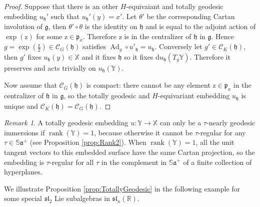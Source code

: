 \documentclass[reqno,10pt]{amsart}
\theoremstyle{plain}
\theoremstyle{definition}
\theoremstyle{remark}
\newtheorem{rem}[thm]{Remark}
\newcommand{\type}{\tau}
\newcommand{\R}{\mathbb{R}}
\newcommand{\Sph}{\mathbb{S}}
\DeclareMathOperator{\Ad}{Ad}
\DeclareMathOperator{\rank}{rank}
\newcommand{\X}{\mathbb{X}}
\begin{document}
\begin{proof}
\medskip
Suppose that there is an other $H$-equivaiant and totally geodesic embedding $u_\mathfrak{h}'$ such that $u_\mathfrak{h}'(y)=x'$. Let $\theta'$ be the corresponding Cartan involution of $\mathfrak{g}$, then $\theta' \circ \theta$ is the identity on $\mathfrak{h}$ and is equal to the adjoint action of $\exp(\mathrm{z})$ for some $\mathrm{z}\in \mathfrak{p}_{x}$. Therefore $\mathrm{z}$ is in the centralizer of $\mathfrak{h}$ in $\mathfrak{g}$. 
Hence $g=\exp(\frac{\mathrm{z}}{2})\in 
\mathcal{C}_G(\mathfrak{h})$ satisfies $\Ad_g\circ u'_\mathfrak{h}=u_\mathfrak{h}$.
Conversely let $g'\in \mathcal{C}_K\left(\mathfrak{h}\right)$, then $g'$ fixes $u_\mathfrak{h}(y)\in \X$ and it fixes $\mathfrak{h}$ so it fixes $\mathrm{d}u_\mathfrak{h}(T_y\mathbb{Y})$. Therefore it preserves and acts trivially on $u_\mathfrak{h}(\mathbb{Y})$. 

\medskip

Now assume that $\mathcal{C}_G(\mathfrak{h})$ is compact: there cannot be any element $\mathrm{z}\in \mathfrak{p}_x$ in the centralizer of $\mathfrak{h}$ in $\mathfrak{g}$, so the totally geodesic and $H$-equivariant embedding $u_\mathfrak{h}$ is unique and $\mathcal{C}_K\left(\mathfrak{h}\right)=\mathcal{C}_G(\mathfrak{h})$.
\end{proof}

\begin{rem}
A totally geodesic embedding $u:\mathbb{Y}\to \mathbb{X}$ can only be a $\type$-nearly geodesic immersions if $\rank(\mathbb{Y})=1$, because otherwise it cannot be $\type$-regular for any $\type\in \Sph\mathfrak{a}^+$ (see Proposition \ref{prop:Rank2}). When $\rank(\mathbb{Y})=1$, all the unit tangent vectors to this embedded surface have the same Cartan projection, so the embedding is $\type$-regular for all $\type$ in the complement in $\Sph\mathfrak{a}^+$ of a finite collection of hyperplanes.
\end{rem}

We illustrate Proposition \ref{prop:TotallyGeodesic} in the following example for some special $\mathfrak{sl}_2$ Lie subalgebras in $\mathfrak{sl}_n(\R)$.
\end{document}
